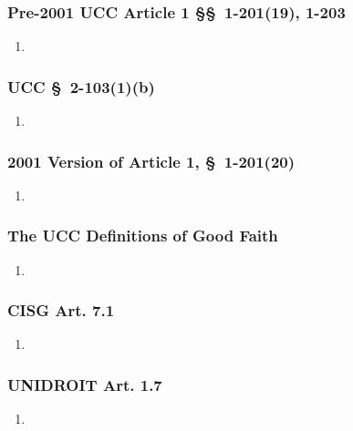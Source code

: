 \subsubsection{Pre-2001 UCC Article 1 \S\S\ 1-201(19), 1-203}

\begin{enumerate}
    \item %
\end{enumerate}

\subsubsection{UCC \S\ 2-103(1)(b)}

\begin{enumerate}
    \item %
\end{enumerate}

\subsubsection{2001 Version of Article 1, \S\ 1-201(20)}

\begin{enumerate}
    \item %
\end{enumerate}

\subsubsection{The UCC Definitions of Good Faith}

\begin{enumerate}
    \item %
\end{enumerate}

\subsubsection{CISG Art. 7.1}

\begin{enumerate}
    \item %
\end{enumerate}

\subsubsection{UNIDROIT Art. 1.7}

\begin{enumerate}
    \item %
\end{enumerate}


